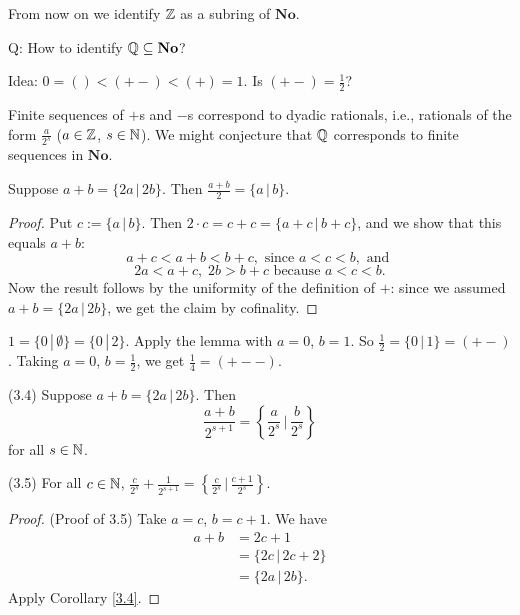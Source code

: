 From now on we identify $\mathbb{Z}$ as a subring of $\mathbf{No}$.

Q: How to identify $\mathbb{Q}\subseteq \mathbf{No}$?

Idea: $0 = () < (+-) < (+) = 1$. Is $(+-)=\tfrac12$?

Finite sequences of $+$s and $-$s correspond to dyadic rationals, i.e., rationals of the form $\frac{a}{2^s}$ ($a\in\mathbb{Z}$, $s\in\mathbb{N}$). We might conjecture that $\mathbb{Q}$ corresponds to finite sequences in $\mathbf{No}$.

\begin{lemma}
Suppose $a+b = \{2a \,|\, 2b \}$. Then $\frac{a+b}2 = \{a \,|\, b \}$.
\end{lemma}

\begin{proof}
Put $c := \{a \,|\, b\}$. Then $2\cdot c = c+ c = \{a+c \,|\, b+c \}$, and we show that this equals $a+b$:
\[ a+c < a+b < b+c, \text{ since } a< c < b, \text{ and } \]
\[ 2a < a+c, \; 2b > b+c \text{ because } a<c < b. \]
Now the result follows by the uniformity of the definition of $+$: since we assumed $a+b = \{2a \,|\, 2b \}$, we get the claim by cofinality.
\end{proof}

\begin{example}
$1 = \{ 0 \,|\, \emptyset \} = \{ 0 \,|\, 2 \}$. Apply the lemma with $a=0$, $b=1$.
So $\tfrac12 = \{0 \,|\, 1 \} = (+-)$. Taking $a=0$, $b=\tfrac12$, we get $\tfrac14 = (+--)$.
\end{example}

\begin{cor} (3.4)
Suppose $a + b = \{ 2a \,|\, 2b \}$. Then 
\[ \frac{a+b}{2^{s+1}} = \left\{ \frac{a}{2^s} \,\bigg|\, \frac{b}{2^s} \right\}  \]
for all $s\in\mathbb{N}$.
\label{3.4}
\end{cor}

\begin{cor} (3.5)
For all $c\in\mathbb{N}$, $\frac{c}{2^s} + \frac{1}{2^{s+1}} = \left\{ \frac{c}{2^s} \,|\, \frac{c+1}{2^s} \right\}$.
\label{3.5}
\end{cor}

\begin{proof} (Proof of 3.5)
Take $a=c$, $b=c+1$. We have
\begin{align*}
a+b &= 2c+1 \\
&= \{ 2c \,|\, 2c+2 \} \\
&= \{ 2a \,|\, 2b \}.
\end{align*}
Apply Corollary \ref{3.4}.
\end{proof}

